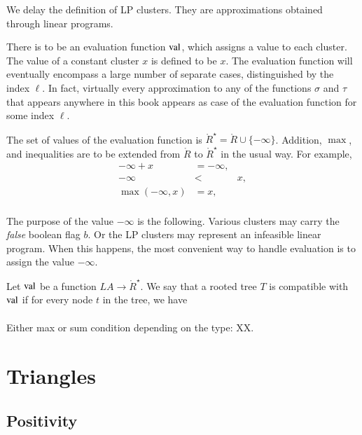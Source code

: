 We delay the definition of LP clusters.  They are approximations
obtained through linear programs.



There is to be an evaluation function ${\operatorname{val}}$, which assigns a value
to each cluster.  The value of a constant cluster $x$ is defined to be $x$.
The evaluation function will eventually encompass a large number of
separate cases, distinguished by the index $\ell$.  
In fact, virtually every approximation
to any of the functions $\sigma$ and $\tau$ that appears anywhere
in this book appears as case of the evaluation function for some index
$\ell$.

The set of values of the evaluation function is 
$\ring{R}^\star = \ring{R}\cup\{-\infty\}$.
Addition, $\max$, and inequalities are to be extended from
$\ring{R}$ to $\ring{R}^\star$ in the usual way.  For example,
  $$
  \begin{array}{lll}
    -\infty + x &= -\infty,\\
    -\infty &< & x,\\
    \max(-\infty,x) &= x,\\
    \end{array}
  $$

The purpose of the value $-\infty$ is the following.  Various
clusters may carry the {\it false} boolean flag $b$.  Or the
LP clusters may represent an infeasible linear program.  When
this happens, the most convenient way to handle evaluation is
to assign the value $-\infty$.

\begin{definition}
Let ${\operatorname{val}}$
be a function $LA\to \ring{R}^\star$.  We say that
a rooted tree $T$ is compatible with ${\operatorname{val}}$ if for every
node $t$ in the tree, we have
   $$
   \begin{array}{lll}
     \end{array}
   $$
\end{definition}

Either max or sum condition depending on the type: XX.











\section{Triangles}


\subsection{Positivity}%


